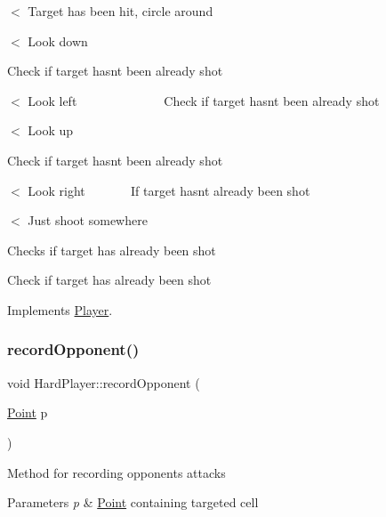 $<$ Target has been hit, circle around

$<$ Look down

Check if target hasn\textquotesingle{}t been already shot

$<$ Look left ~\newline
~\newline
~\newline
~\newline
~\newline
~\newline
~\newline
~\newline
 Check if target hasn\textquotesingle{}t been already shot

$<$ Look up

Check if target hasn\textquotesingle{}t been already shot

$<$ Look right ~\newline
~\newline
~\newline
~\newline
 If target hasn\textquotesingle{}t already been shot

$<$ Just shoot somewhere

Checks if target has already been shot

Check if target has already been shot 

Implements \mbox{\hyperlink{class_player_a2cc7a83d11158eafd8d49d4b9f23ce56}{Player}}.

\mbox{\label{class_hard_player_a986175fb966099ac5fe39950e18799ae}} 
\subsubsection{\texorpdfstring{record\+Opponent()}{recordOpponent()}}
{\footnotesize\ttfamily void Hard\+Player\+::record\+Opponent (\begin{DoxyParamCaption}\item[{\mbox{\hyperlink{class_point}{Point}}}]{p }\end{DoxyParamCaption})\hspace{0.3cm}{\ttfamily [virtual]}}

Method for recording opponent\textquotesingle{}s attacks 
\begin{DoxyParams}{Parameters}
{\em p} & \mbox{\hyperlink{class_point}{Point}} containing targeted cell \\
\hline
\end{DoxyParams}


